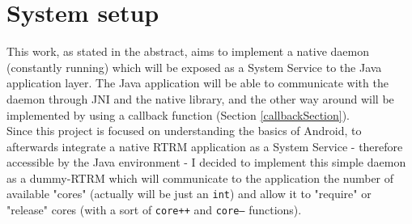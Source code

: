 \section{System setup}
\label{Customising}
This work, as stated in the abstract, aims to implement a native daemon (constantly running) which will be exposed as a System Service to the Java application layer. The Java application will be able to communicate with the daemon through JNI and the native library, and the other way around will be implemented by using a callback function (Section \ref{callbackSection}).\\
Since this project is focused on understanding the basics of Android, to afterwards integrate a native RTRM application as a System Service - therefore accessible by the Java environment - I decided to implement this simple daemon as a dummy-RTRM which will communicate to the application the number of available "cores" (actually will be just an \texttt{int}) and allow it to "require" or "release" cores (with a sort of \texttt{core++} and \texttt{core--} functions).
